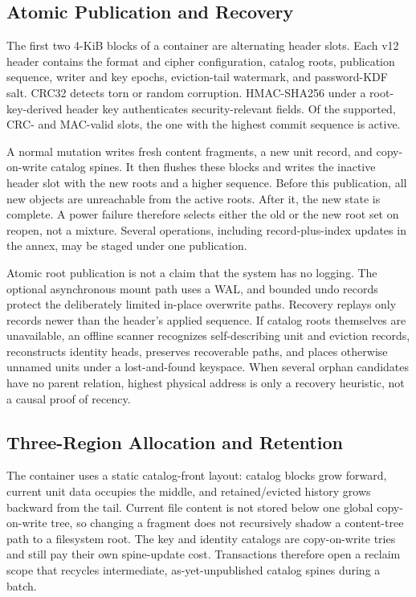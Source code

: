 \subsection{Atomic Publication and Recovery}
\label{subsec:commit}

The first two 4-KiB blocks of a container are alternating header slots.  Each
v12 header contains the format and cipher configuration, catalog roots,
publication sequence, writer and key epochs, eviction-tail watermark, and
password-KDF salt.  CRC32 detects torn or random corruption.  HMAC-SHA256 under a
root-key-derived header key authenticates security-relevant fields.  Of the
supported, CRC- and MAC-valid slots, the one with the highest commit sequence is
active.

A normal mutation writes fresh content fragments, a new unit record, and
copy-on-write catalog spines.  It then flushes these blocks and writes the
inactive header slot with the new roots and a higher sequence.  Before this
publication, all new objects are unreachable from the active roots.  After it,
the new state is complete.  A power failure therefore selects either the old
or the new root set on reopen, not a mixture.  Several operations, including
record-plus-index updates in the annex, may be staged under one publication.

Atomic root publication is not a claim that the system has no logging.  The
optional asynchronous mount path uses a WAL, and bounded undo records protect
the deliberately limited in-place overwrite paths.  Recovery replays only
records newer than the header's applied sequence.  If catalog roots themselves
are unavailable, an offline scanner recognizes self-describing unit and
eviction records, reconstructs identity heads, preserves recoverable paths, and
places otherwise unnamed units under a lost-and-found keyspace.  When several
orphan candidates have no parent relation, highest physical address is only a
recovery heuristic, not a causal proof of recency.

\subsection{Three-Region Allocation and Retention}
\label{subsec:alloc}

The container uses a static catalog-front layout: catalog blocks grow forward,
current unit data occupies the middle, and retained/evicted history grows
backward from the tail.  Current file content is not stored below one global
copy-on-write tree, so changing a fragment does not recursively shadow a
content-tree path to a filesystem root.  The key and identity catalogs are
copy-on-write tries and still pay their own spine-update cost.  Transactions
therefore open a reclaim scope that recycles intermediate, as-yet-unpublished
catalog spines during a batch.

